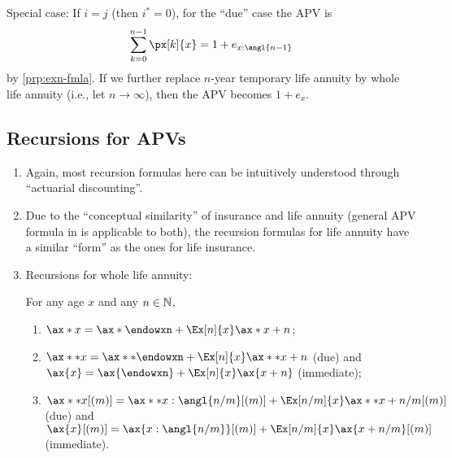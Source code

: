 \begin{enumerate}
\begin{note}
Special case: If \(i=j\) (then \(i^{*}=0\)), for the ``due'' case the APV is
\[
\sum_{k=0}^{n-1}\px[k]{x}
=1+e_{x:\angl{n-1}}
\]
by \cref{prp:exn-fmla}. If we further replace \(n\)-year temporary life
annuity by whole life annuity (i.e., let \(n\to\infty\)), then the APV
becomes \(1+e_x\).
\end{note}
\end{enumerate}
\subsection{Recursions for APVs}
\begin{enumerate}
\item Again, most recursion formulas here can be intuitively understood through
``actuarial discounting''.
\item Due to the ``conceptual similarity'' of insurance and life annuity
(general APV formula in  is applicable to both), the
recursion formulas for life annuity have a similar ``form'' as the ones for
life insurance.
\item Recursions for whole life annuity:
\begin{proposition}
\label{prp:wl-annuity-recursions}
For any age \(x\) and any \(n\in\mathbb{N}\),
\begin{enumerate}
\item \(\ax*{x}=\ax*{\endowxn}+\Ex[n]{x}\ax*{x+n}\);
\item \(\ax**{x}=\ax**{\endowxn}+\Ex[n]{x}\ax**{x+n}\) (due) and
\(\ax{x}=\ax{\endowxn}+\Ex[n]{x}\ax{x+n}\) (immediate);
\item \(\ax**{x}[(m)]=\ax**{x:\angl{n/m}}[(m)]+\Ex[n/m]{x}\ax**{x+n/m}[(m)]\) (due) and
\(\ax{x}[(m)]=\ax{x:\angl{n/m}}[(m)]+\Ex[n/m]{x}\ax{x+n/m}[(m)]\) (immediate).
\end{enumerate}
\end{proposition}
\begin{intuition}

\end{intuition}


\end{enumerate}
